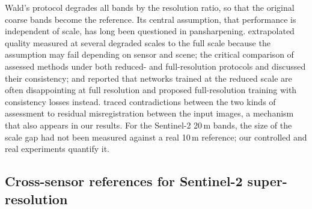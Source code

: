 \documentclass[pdflatex,sn-basic,referee,lineno]{sn-jnl}
\begin{document}
Wald's protocol \citep{wald1997fusion} degrades all bands by the resolution ratio, so that the original
coarse bands become the reference. Its central assumption, that performance is independent of scale, has long been
questioned in pansharpening. \citet{carla2015fullscale} extrapolated quality measured at several degraded scales to
the full scale because the assumption may fail depending on sensor and scene; the critical comparison of
\citet{vivone2015critical} assessed methods under both reduced- and full-resolution protocols and discussed their
consistency; and
\citet{ciotola2022fullres} reported that networks trained at the reduced scale are often disappointing at full
resolution and proposed full-resolution training with consistency losses instead. \citet{alparone2023fullscale}
traced contradictions between the two kinds of assessment to residual misregistration between the input images, a
mechanism that also appears in our results. For the Sentinel-2 20\,m bands, the size of the scale gap had not been
measured against a real 10\,m reference; our controlled and real experiments quantify it.

\subsection{Cross-sensor references for Sentinel-2 super-resolution}
\end{document}
